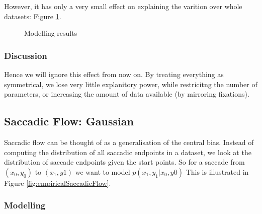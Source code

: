 \documentclass[a4paper, onecolumn, oneside, 11pt]{article}
\begin{document}
However, it has only a very small effect on explaining the varition over whole datasets: Figure \ref{fig:leftrightModelling}.

\begin{figure}
\centering
{}
\caption{Modelling results}
\label{fig:leftrightModelling}
\end{figure}

\subsubsection{Discussion}

Hence we will ignore this effect from now on. By treating everything as symmetrical, we lose very little explanitory power, while restricitng the number of parameters, or increasing the amount of data available (by mirroring fixations).

\subsection{Saccadic Flow: Gaussian}

Saccadic flow can be thought of as a generalisation of the central bias. Instead of computing the distribution of all saccadic endpoints in a dataset, we look at the distribution of saccade endpoints given the start points. So for a saccade from $(x_0, y_0)$ to $(x_1, y1)$ we want to model $p(x_1,y_1|x_0, y0)$ This is illustrated in Figure \ref{fig:empiricalSaccadicFlow}.

\subsubsection{Modelling}
\end{document}
